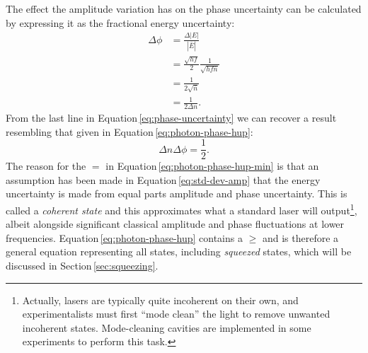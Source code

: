 The effect the amplitude variation has on the phase uncertainty can be calculated by expressing it as the fractional energy uncertainty:
\begin{equation}
  \label{eq:phase-uncertainty}
  \begin{split}
    \Delta \phi &= \frac{\Delta \left| E \right|}{\left| \bar{E} \right|} \\
                &= \frac{\sqrt{hf}}{2} \frac{1}{\sqrt{hf \bar{n}}} \\
                &= \frac{1}{2 \sqrt{\bar{n}}} \\
                &= \frac{1}{2 \Delta n}.
  \end{split}
\end{equation}
From the last line in Equation\,\ref{eq:phase-uncertainty} we can recover a result resembling that given in Equation\,\ref{eq:photon-phase-hup}:
\begin{equation}
  \label{eq:photon-phase-hup-min}
  \Delta n \Delta \phi = \frac{1}{2}.
\end{equation}
The reason for the $=$ in Equation\,\ref{eq:photon-phase-hup-min} is that an assumption has been made in Equation\,\ref{eq:std-dev-amp} that the energy uncertainty is made from equal parts amplitude and phase uncertainty. This is called a \emph{coherent state} and this approximates what a standard laser will output\footnote{Actually, lasers are typically quite incoherent on their own, and experimentalists must first ``mode clean'' the light to remove unwanted incoherent states. Mode-cleaning cavities are implemented in some experiments to perform this task.}, albeit alongside significant classical amplitude and phase fluctuations at lower frequencies. Equation\,\ref{eq:photon-phase-hup} contains a $\geq$ and is therefore a general equation representing all states, including \emph{squeezed} states, which will be discussed in Section\,\ref{sec:squeezing}.

